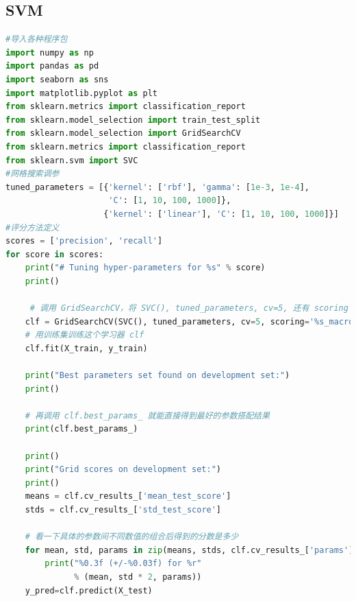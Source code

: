 \documentclass[11pt,a4paper]{article}\usepackage[]{graphicx}\usepackage[]{color}
\begin{document}
	\subsection{SVM}
		\begin{lstlisting}[language=python, caption=SVM  ,label={labelkode}]
  #导入各种程序包
import numpy as np
import pandas as pd
import seaborn as sns
import matplotlib.pyplot as plt
from sklearn.metrics import classification_report
from sklearn.model_selection import train_test_split
from sklearn.model_selection import GridSearchCV
from sklearn.metrics import classification_report
from sklearn.svm import SVC
#网格搜索调参
tuned_parameters = [{'kernel': ['rbf'], 'gamma': [1e-3, 1e-4],
                     'C': [1, 10, 100, 1000]},
                    {'kernel': ['linear'], 'C': [1, 10, 100, 1000]}]
#评分方法定义
scores = ['precision', 'recall']
for score in scores:
    print("# Tuning hyper-parameters for %s" % score)
    print()

     # 调用 GridSearchCV，将 SVC(), tuned_parameters, cv=5, 还有 scoring 传递进去，
    clf = GridSearchCV(SVC(), tuned_parameters, cv=5, scoring='%s_macro' % score)
    # 用训练集训练这个学习器 clf
    clf.fit(X_train, y_train)

    print("Best parameters set found on development set:")
    print()

    # 再调用 clf.best_params_ 就能直接得到最好的参数搭配结果
    print(clf.best_params_)

    print()
    print("Grid scores on development set:")
    print()
    means = clf.cv_results_['mean_test_score']
    stds = clf.cv_results_['std_test_score']

    # 看一下具体的参数间不同数值的组合后得到的分数是多少
    for mean, std, params in zip(means, stds, clf.cv_results_['params']):
        print("%0.3f (+/-%0.03f) for %r"
              % (mean, std * 2, params))
    y_pred=clf.predict(X_test)
  \end{lstlisting}
\end{document}
